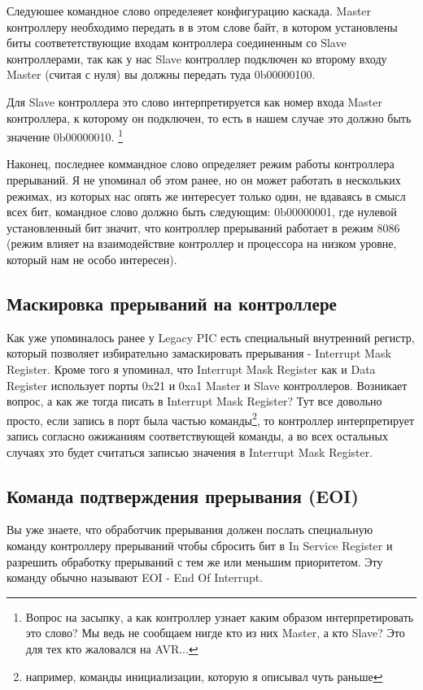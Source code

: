 Следуюшее командное слово определеяет конфигурацию каскада. Master контроллеру
необходимо передать в в этом слове байт, в котором установлены биты
соответетствующие входам контроллера соединенным со Slave контроллерами, так как
у нас Slave контроллер подключен ко второму входу Master (считая с нуля) вы
должны передать туда 0b00000100.

Для Slave контроллера это слово интерпретируется как номер входа Master
контроллера, к которому он подключен, то есть в нашем случае это должно быть
значение 0b00000010. \footnote{Вопрос на засыпку, а как контроллер узнает каким
образом интерпретировать это слово? Мы ведь не сообщаем нигде кто из них Master,
а кто Slave? Это для тех кто жаловался на AVR...}

Наконец, последнее коммандное слово определяет режим работы контроллера
прерываний. Я не упоминал об этом ранее, но он может работать в нескольких
режимах, из которых нас опять же интересует только один, не вдаваясь в смысл
всех бит, командное слово должно быть следующим: 0b00000001, где нулевой
установленный бит значит, что контроллер прерываний работает в режим 8086
(режим влияет на взаимодействие контроллер и процессора на низком уровне,
который нам не особо интересен).

\subsection{Маскировка прерываний на контроллере}

Как уже упоминалось ранее у Legacy PIC есть специальный внутренний регистр,
который позволяет избирательно замаскировать прерывания - Interrupt Mask
Register. Кроме того я упоминал, что Interrupt Mask Register как и Data Register
использует порты 0x21 и 0xa1 Master и Slave контроллеров. Возникает вопрос, а
как же тогда писать в Interrupt Mask Register? Тут все довольно просто, если
запись в порт была частью команды\footnote{например, команды инициализации,
которую я описывал чуть раньше}, то контроллер интерпретирует запись согласно
ожижаниям соответствующей команды, а во всех остальных случаях это будет
считаться записью значения в Interrupt Mask Register.

\subsection{Команда подтверждения прерывания (EOI)}

Вы уже знаете, что обработчик прерывания должен послать специальную команду
контроллеру прерываний чтобы сбросить бит в In Service Register и разрешить
обработку прерываний с тем же или меньшим приоритетом. Эту команду обычно
называют EOI - End Of Interrupt.

